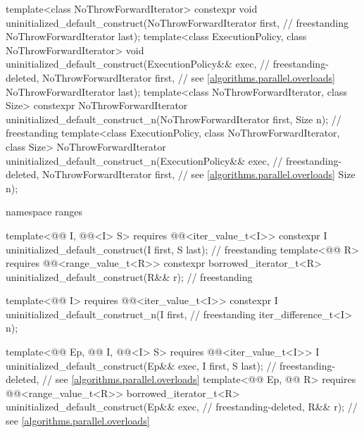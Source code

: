 \begin{codeblock}
{  template<class NoThrowForwardIterator>
    constexpr void uninitialized_default_construct(NoThrowForwardIterator first,    // freestanding
                                                   NoThrowForwardIterator last);
  template<class ExecutionPolicy, class NoThrowForwardIterator>
    void uninitialized_default_construct(ExecutionPolicy&& exec,            // freestanding-deleted,
                                         NoThrowForwardIterator first,      // see \ref{algorithms.parallel.overloads}
                                         NoThrowForwardIterator last);
  template<class NoThrowForwardIterator, class Size>
    constexpr NoThrowForwardIterator
      uninitialized_default_construct_n(NoThrowForwardIterator first, Size n);      // freestanding
  template<class ExecutionPolicy, class NoThrowForwardIterator, class Size>
    NoThrowForwardIterator
      uninitialized_default_construct_n(ExecutionPolicy&& exec,             // freestanding-deleted,
                                        NoThrowForwardIterator first,       // see \ref{algorithms.parallel.overloads}
                                        Size n);

  namespace ranges {
    template<@@ I, @@<I> S>
      requires @@<iter_value_t<I>>
        constexpr I uninitialized_default_construct(I first, S last);               // freestanding
    template<@@ R>
      requires @@<range_value_t<R>>
        constexpr borrowed_iterator_t<R> uninitialized_default_construct(R&& r);    // freestanding

    template<@@ I>
      requires @@<iter_value_t<I>>
        constexpr I uninitialized_default_construct_n(I first,                      // freestanding
                                                      iter_difference_t<I> n);

    template<@@ Ep, @@ I,
             @@<I> S>
      requires @@<iter_value_t<I>>
        I uninitialized_default_construct(Ep&& exec, I first, S last);      // freestanding-deleted,
                                                                            // see \ref{algorithms.parallel.overloads}
    template<@@ Ep, @@ R>
      requires @@<range_value_t<R>>
        borrowed_iterator_t<R> uninitialized_default_construct(Ep&& exec,   // freestanding-deleted,
                                                               R&& r);      // see \ref{algorithms.parallel.overloads}

}}
\end{codeblock}
